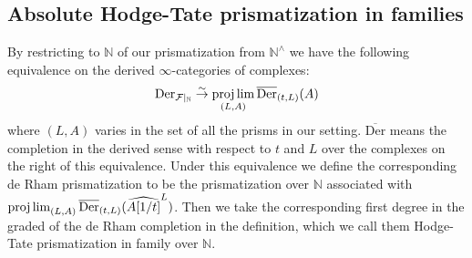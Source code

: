 \documentclass[12pt]{article}
\theoremstyle{definition}
\begin{document}
\subsection{Absolute Hodge-Tate prismatization in families}



By restricting to $\mathbb{N}$ of our prismatization from $\mathbb{N}^\wedge$ we have the following equivalence on the derived $\infty$-categories of complexes:
\begin{align}
\mathrm{Der}_{\mathcal{F}|_{\mathbb{N}}}\overset{\sim}{\rightarrow} \projlim_{(L,A)}\overline{\mathrm{Der}}_{(t,L)}(A)
\end{align}
where $(L,A)$ varies in the set of all the prisms in our setting. $\overline{\mathrm{Der}}$ means the completion in the derived sense with respect to $t$ and $L$ over the complexes on the right of this equivalence. Under this equivalence we define the corresponding de Rham prismatization to be the prismatization over $\mathbb{N}$ associated with $\projlim_{(L,A)}\overline{\mathrm{Der}}_{(t,L)}(\widehat{A[1/t]}^{L})$. Then we take the corresponding first degree in the graded of the de Rham completion in the definition, which we call them Hodge-Tate prismatization in family over $\mathbb{N}$.
\end{document}
